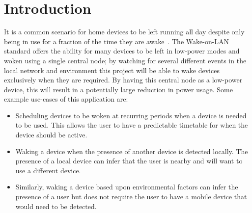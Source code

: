 \section{Introduction}

It is a common scenario for home devices to be left running all day despite only being in use for a fraction of the time they are awake~\cite{urban_energy_nodate}. The Wake-on-LAN standard offers the ability for many devices to be left in low-power modes and woken using a single central node; by watching for several different events in the local network and environment this project will be able to wake devices exclusively when they are required. By having this central node as a low-power device, this will result in a potentially large reduction in power usage.
\x
Some example use-cases of this application are:

\begin{itemize}[noitemsep]
    \item Scheduling devices to be woken at recurring periods when a device is needed to be used. This allows the user to have a predictable timetable for when the device should be active.
    \item Waking a device when the presence of another device is detected locally. The presence of a local device can infer that the user is nearby and will want to use a different device.
    \item Similarly, waking a device based upon environmental factors can infer the presence of a user but does not require the user to have a mobile device that would need to be detected.
\end{itemize}
